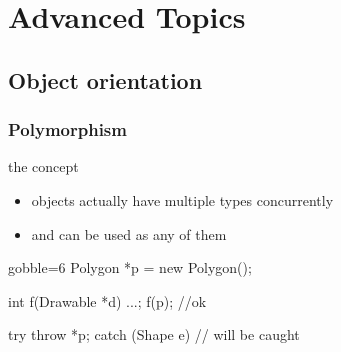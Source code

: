 \section{Advanced Topics}

\subsection[OO]{Object orientation}

\begin{frame}[fragile]
  \frametitle{Polymorphism}
  \begin{block}{the concept}
    \begin{itemize}
    \item objects actually have multiple types concurrently
    \item and can be used as any of them
    \end{itemize}
  \end{block}
  \begin{multicols}{2}
    \begin{cppcode*}{gobble=6}
      Polygon *p = new Polygon();

      int f(Drawable *d) {...};
      f(p);  //ok

      try {
        throw *p;
      } catch (Shape e) {
        // will be caught
      }
    \end{cppcode*}
    \columnbreak
    \center
  \end{multicols}
\end{frame}


